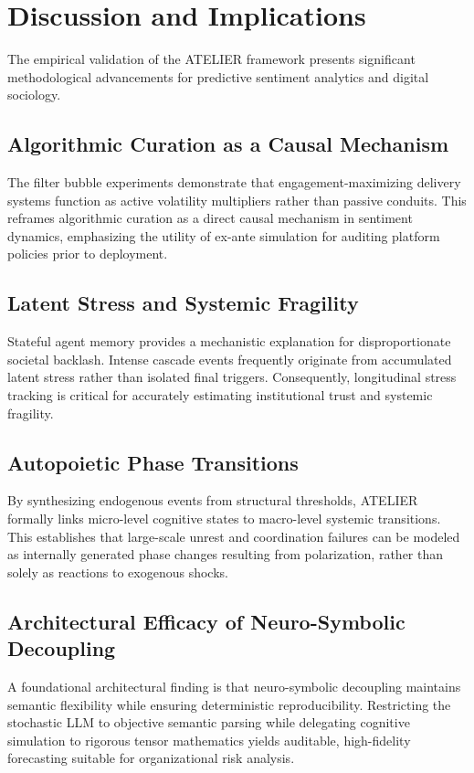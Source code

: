 \documentclass[12pt]{IEEEtran}
\begin{document}
\section{Discussion and Implications}
\label{sec:discussion}

The empirical validation of the ATELIER framework presents significant methodological advancements for predictive sentiment analytics and digital sociology.

\subsection{Algorithmic Curation as a Causal Mechanism}
The filter bubble experiments demonstrate that engagement-maximizing delivery systems function as active volatility multipliers rather than passive conduits. This reframes algorithmic curation as a direct causal mechanism in sentiment dynamics, emphasizing the utility of ex-ante simulation for auditing platform policies prior to deployment.

\subsection{Latent Stress and Systemic Fragility}
Stateful agent memory provides a mechanistic explanation for disproportionate societal backlash. Intense cascade events frequently originate from accumulated latent stress rather than isolated final triggers. Consequently, longitudinal stress tracking is critical for accurately estimating institutional trust and systemic fragility.

\subsection{Autopoietic Phase Transitions}
By synthesizing endogenous events from structural thresholds, ATELIER formally links micro-level cognitive states to macro-level systemic transitions. This establishes that large-scale unrest and coordination failures can be modeled as internally generated phase changes resulting from polarization, rather than solely as reactions to exogenous shocks.

\subsection{Architectural Efficacy of Neuro-Symbolic Decoupling}
A foundational architectural finding is that neuro-symbolic decoupling maintains semantic flexibility while ensuring deterministic reproducibility. Restricting the stochastic LLM to objective semantic parsing while delegating cognitive simulation to rigorous tensor mathematics yields auditable, high-fidelity forecasting suitable for organizational risk analysis.
\end{document}
